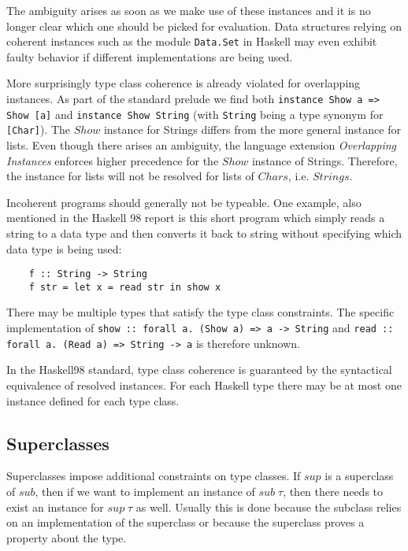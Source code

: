 The ambiguity arises as soon as we make use of these instances and it is no longer clear which one should be picked for evaluation.
Data structures relying on coherent instances such as the module \texttt{Data.Set} in Haskell may even exhibit faulty behavior if different implementations are being used. \cite{Kilpatrick2019-cy}

More surprisingly type class coherence is already violated for overlapping instances.
As part of the standard prelude we find both \texttt{instance Show a => Show [a]} and \texttt{instance Show String}
(with \texttt{String} being a type synonym for \texttt{[Char]}).
The $\mathit{Show}$ instance for Strings differs from the more general instance for lists.
Even though there arises an ambiguity, the language extension \emph{Overlapping Instances} enforces higher precedence for the $Show$ instance of Strings.
Therefore, the instance for lists will not be resolved for lists of $Chars$, i.e. $Strings$.

Incoherent programs should generally not be typeable.
One example, also mentioned in the Haskell 98 report \cite{Haskell98} is this short program which simply reads a string to a data type and then converts it back to string without specifying which data type is being used:

\begin{verbatim}
    f :: String -> String
    f str = let x = read str in show x
\end{verbatim}

There may be multiple types that satisfy the type class constraints.
The specific implementation of \texttt{show :: forall a. (Show a) => a -> String} and \texttt{read :: forall a. (Read a) => String -> a} is therefore unknown.

In the Haskell98 standard, type class coherence is guaranteed by the syntactical equivalence of resolved instances.
For each Haskell type there may be at most one instance defined for each type class.


\subsection{Superclasses}

Superclasses impose additional constraints on type classes.
If $sup$ is a superclass of $sub$, then if we want to implement an instance of $sub \;\tau$, then there needs to exist an instance for $sup \;\tau$ as well.
Usually this is done because the subclass relies on an implementation of the superclass or because the superclass proves a property about the type.


